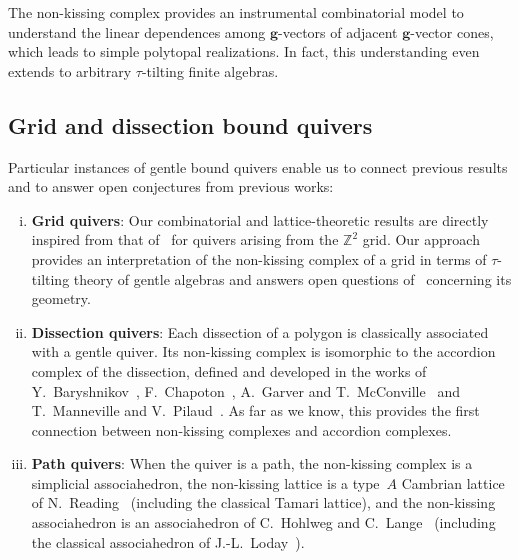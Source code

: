 \documentclass{memo-l}
\theoremstyle{definition}
\newcommand{\Z}{\mathbb{Z}} %
\renewcommand{\b}[1]{\mathbf{#1}} %
\begin{document}
\noindent
The non-kissing complex provides an instrumental combinatorial model to understand the linear dependences among $\b{g}$-vectors of adjacent $\b{g}$-vector cones, which leads to simple polytopal realizations.
In fact, this understanding even extends to arbitrary $\tau$-tilting finite algebras.


\subsection*{Grid and dissection bound quivers}

Particular instances of gentle bound quivers enable us to connect previous results and to answer open conjectures from previous works:
\begin{enumerate}[(i)]
\item \textbf{Grid quivers}: Our combinatorial and lattice-theoretic results are directly inspired from that of~\cite{PetersenPylyavskyySpeyer, SantosStumpWelker, McConville, GarverMcConville-grid} for quivers arising from the $\Z^2$ grid. Our approach provides an interpretation of the non-kissing complex of a grid in terms of $\tau$-tilting theory of gentle algebras and answers open questions of~\cite{GarverMcConville-grid} concerning its geometry.
\item \textbf{Dissection quivers}: Each dissection of a polygon is classically associated with a gentle quiver. Its non-kissing complex is isomorphic to the accordion complex of the dissection, defined and developed in the works of Y.~Baryshnikov~\cite{Baryshnikov}, F.~Chapoton~\cite{Chapoton-quadrangulations}, A.~Garver and T.~McConville~\cite{GarverMcConville} and T.~Manneville and V.~Pilaud~\cite{MannevillePilaud-accordion}. As far as we know, this provides the first connection between non-kissing complexes and accordion complexes.
\item \textbf{Path quivers}: When the quiver is a path, the non-kissing complex is a simplicial associahedron, the non-kissing lattice is a type~$A$ Cambrian lattice of N.~Reading~\cite{Reading-CambrianLattices} (including the classical Tamari lattice), and the non-kissing associahedron is an associahedron of C.~Hohlweg and C.~Lange~\cite{HohlwegLange} (including the classical associahedron of J.-L.~Loday~\cite{Loday}).
\end{enumerate}
\end{document}
